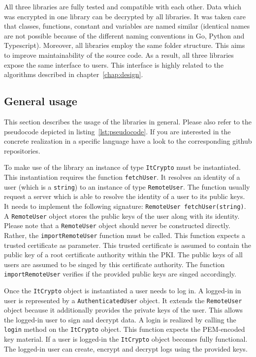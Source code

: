 \documentclass[../main.tex]{subfiles}
\begin{document}
All three libraries are fully tested and compatible with each other.
Data which was encrypted in one library can be decrypted by all libraries.
It was taken care that classes, functions, constant and variables are named similar (identical names are not possible because of the different naming conventions in Go, Python and Typescript).
Moreover, all libraries employ the same folder structure.
This aims to improve maintainability of the source code.
As a result, all three libraries expose the same interface to users.
This interface is highly related to the algorithms described in chapter~\ref{chap:design}.

\subsection{General usage}

This section describes the usage of the libraries in general.
Please also refer to the pseudocode depicted in listing~\ref{lst:pseudocode}.
If you are interested in the concrete realization in a specific language have a look to the corresponding github repositories.

To make use of the library an instance of type \verb|ItCrypto| must be instantiated.
This instantiation requires the function \verb|fetchUser|.
It resolves an identity of a user (which is a \verb|string|) to an instance of type \verb|RemoteUser|.
The function usually request a server which is able to resolve the identity of a user to its public keys.
It needs to implement the following signature: \verb|RemoteUser fetchUser(string)|.
A \verb|RemoteUser| object stores the public keys of the user along with its identity.
Please note that a \verb|RemoteUser| object should never be constructed directly.
Rather, the \verb|importRemoteUser| function must be called.
This function expects a trusted certificate as parameter.
This trusted certificate is assumed to contain the public key of a root certificate authority within the PKI.
The public keys of all users are assumed to be singed by this certificate authority.
The function \verb|importRemoteUser| verifies if the provided public keys are singed accordingly.

Once the \verb|ItCrypto| object is instantiated a user needs to log in.
A logged-in in user is represented by a \verb|AuthenticatedUser| object.
It extends the \verb|RemoteUser| object because it additionally provides the private keys of the user.
This allows the logged-in user to sign and decrypt data.
A login is realized by calling the \verb|login| method on the \verb|ItCrypto| object.
This function expects the PEM-encoded key material.
If a user is logged-in the \verb|ItCrypto| object becomes fully functional.
The logged-in user can create, encrypt and decrypt logs using the provided keys.
\end{document}
